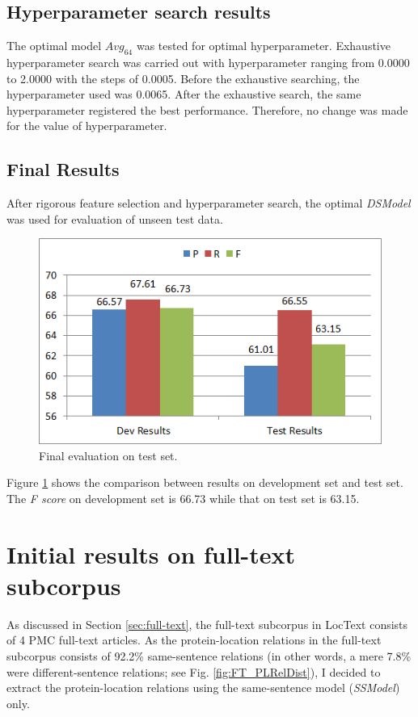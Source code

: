 \subsection{Hyperparameter search results}

The optimal model $Avg_{64}$ was tested for optimal hyperparameter. Exhaustive hyperparameter search was carried out with hyperparameter ranging from 0.0000 to 2.0000 with the steps of 0.0005. Before the exhaustive searching, the hyperparameter used was 0.0065. After the exhaustive search, the same hyperparameter registered the best performance. Therefore, no change was made for the value of hyperparameter.

\subsection{Final Results}

After rigorous feature selection and hyperparameter search, the optimal \textit{DSModel} was used for evaluation of unseen test data.

\begin{figure}
\centering
\includegraphics[scale=0.7]{figures/DSFinalResults.png}
\caption{Final evaluation on test set.}\label{fig:DSFinal}
\end{figure}

Figure \ref{fig:DSFinal} shows the comparison between results on development set and test set. The \textit{F score} on development set is 66.73 while that on test set is 63.15.

\section{Initial results on full-text subcorpus} \label{sec:FTPrimaryRes}

As discussed in Section \ref{sec:full-text}, the full-text subcorpus in LocText consists of 4 PMC \cite{pmc} full-text articles. As the protein-location relations in the full-text subcorpus consists of 92.2\% same-sentence relations (in other words, a mere 7.8\% were different-sentence relations; see Fig. \ref{fig:FT_PLRelDist}), I decided to extract the protein-location relations using the same-sentence model (\textit{SSModel}) only.

